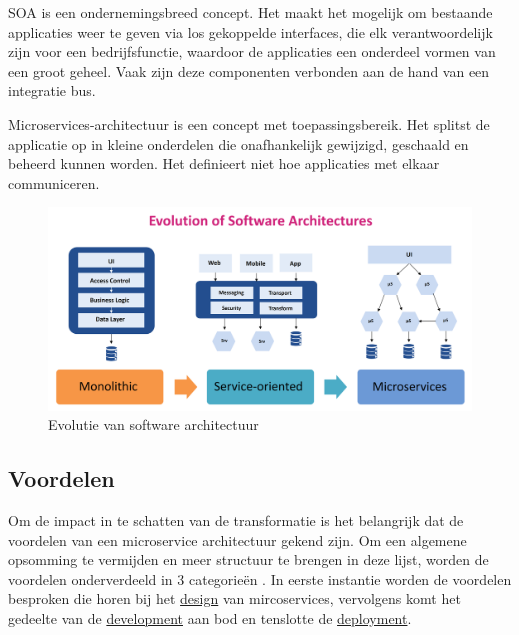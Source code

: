 SOA is een ondernemingsbreed concept. Het maakt het mogelijk om bestaande applicaties weer te geven via los gekoppelde interfaces, die elk verantwoordelijk zijn voor een bedrijfsfunctie, waardoor de applicaties een onderdeel vormen van een groot geheel. Vaak zijn deze componenten verbonden aan de hand van een integratie bus.

Microservices-architectuur is een concept met toepassingsbereik. Het splitst de applicatie op in kleine onderdelen die onafhankelijk gewijzigd, geschaald en beheerd kunnen worden. Het definieert niet hoe applicaties met elkaar communiceren.
\begin{figure}[!htb]
    \includegraphics[width=1\textwidth]{Evolution-of-Software-architectur.png}
    \caption{Evolutie van software architectuur \label{evolution}}
\end{figure}


\subsection{Voordelen}
Om de impact in te schatten van de transformatie is het belangrijk dat de voordelen van een microservice architectuur gekend zijn. Om een algemene opsomming te vermijden en meer structuur te brengen in deze lijst, worden de voordelen onderverdeeld in 3 categorieën . In eerste instantie worden de voordelen besproken die horen bij het \underline{design} van mircoservices, vervolgens komt het gedeelte van de \underline{development} aan bod en tenslotte de \underline{deployment}.\\

